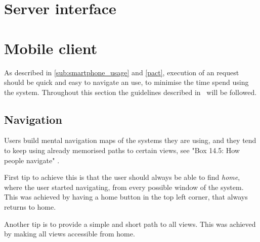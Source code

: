 \section{Server interface}

\section{Mobile client}

As described in \cref{sub:smartphone_usage} and \cref{pact}, execution
of an request should be quick and easy to navigate an use, to minimise
the time spend using the system. Throughout this section the
guidelines described in~\cite{DEB} will be followed.

\subsection{Navigation}

Users build mental navigation maps of the systems they are using, and
they tend to keep using already memorised paths to certain views, see
"Box 14.5: How people navigate" \cite{DEB}. 

First tip to achieve this is that the user should always be able to find \emph{home}, where the user started navigating, from every possible window of the system. This was achieved by having a home button in the top left corner, that always returns to home.

Another tip is to provide a simple and short path to all views. This was achieved by making all views accessible from home.


